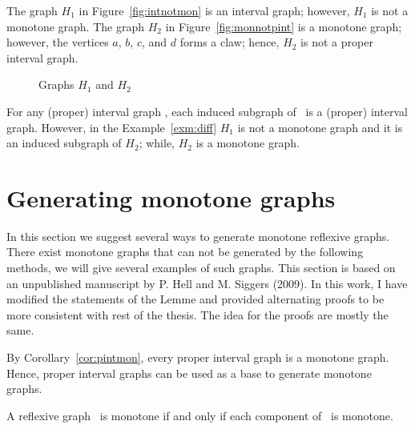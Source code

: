 \begin{example} \label{exm:diff}
The graph \(H_1\) in Figure~\ref{fig:intnotmon} is 
an interval graph; however, \(H_1\) is not a monotone graph.
The graph \(H_2\) in Figure~\ref{fig:monnotpint} is a monotone graph;
however, the vertices \(a\), \(b\), \(c\), and \(d\) forms a claw; hence,
\(H_2\) is not a proper interval graph. 

\begin{figure}[h]
\hspace{2cm}
\subfigure[\ensuremath{H_1}]{\label{fig:intnotmon}}\hspace{4cm}
\subfigure[\ensuremath{H_2}]{\label{fig:monnotpint}}
\caption{Graphs \ensuremath{H_1} and \ensuremath{H_2}}
\end{figure}
\end{example}


For any (proper) interval graph \mH, each induced subgraph of \mH\ is a 
(proper) interval graph. However, in the Example~\ref{exm:diff} \(H_1\)
is not a monotone graph and it is an induced 
subgraph of \(H_2\); while, \(H_2\) is a monotone graph.

\section{Generating monotone graphs}
In this section we suggest several ways to generate monotone reflexive graphs.
There exist monotone graphs that can not be generated by the following methods,
we will give several examples of such graphs. This section is based on an unpublished
manuscript by P. Hell and M. Siggers (2009)\@. In this work, I have modified the
statements of the Lemme and provided alternating proofs to be more consistent with
rest of the thesis. The idea for the proofs are mostly the same.

By Corollary~\ref{cor:pintmon}, every proper interval graph is a monotone graph.
Hence, proper interval graphs can be used as a base to generate monotone graphs.

\begin{lemma} \label{lem:monotone:con}
A reflexive graph \mG\ is monotone if and only if each component of \mG\ is monotone.
\end{lemma}

